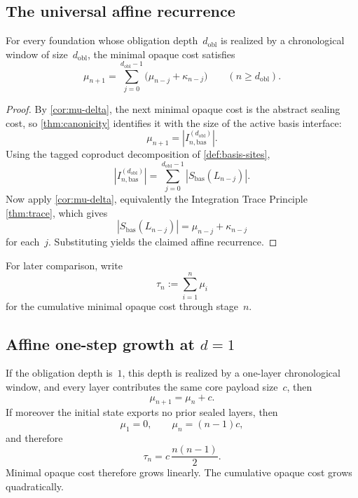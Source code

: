 \documentclass{lmcs}
\begin{document}
\subsection{The universal affine recurrence}

\begin{thm}
\label{thm:recurrence}
For every foundation whose obligation depth~$d_{\mathrm{obl}}$ is realized by a chronological window of size~$d_{\mathrm{obl}}$, the minimal opaque cost satisfies
\[
  \mu_{n+1} = \sum_{j=0}^{d_{\mathrm{obl}}-1} \bigl(\mu_{n-j} + \kappa_{n-j}\bigr)
  \qquad
  (n \geq d_{\mathrm{obl}}).
\]
\end{thm}

\begin{proof}
By \autoref{cor:mu-delta}, the next minimal opaque cost is the abstract sealing cost, so \autoref{thm:canonicity} identifies it with the size of the active basis interface:
\[
  \mu_{n+1} = |I_{n,\mathrm{bas}}^{(d_{\mathrm{obl}})}|.
\]
Using the tagged coproduct decomposition of \autoref{def:basis-sites},
\[
  |I_{n,\mathrm{bas}}^{(d_{\mathrm{obl}})}|
  =
  \sum_{j=0}^{d_{\mathrm{obl}}-1} |S_{\mathrm{bas}}(L_{n-j})|.
\]
Now apply \autoref{cor:mu-delta}, equivalently the Integration Trace Principle \autoref{thm:trace}, which gives
\[
  |S_{\mathrm{bas}}(L_{n-j})| = \mu_{n-j} + \kappa_{n-j}
\]
for each~$j$. Substituting yields the claimed affine recurrence.
\end{proof}

For later comparison, write
\[
  \tau_n := \sum_{i=1}^n \mu_i
\]
for the cumulative minimal opaque cost through stage~$n$.

\subsection{\texorpdfstring{Affine one-step growth at $d=1$}{Affine one-step growth at d=1}}

\begin{cor}
\label{cor:d1}
If the obligation depth is~$1$, this depth is realized by a one-layer chronological window, and every layer contributes the same core payload size~$c$, then
\[
  \mu_{n+1} = \mu_n + c.
\]
If moreover the initial state exports no prior sealed layers, then
\[
  \mu_1 = 0,
  \qquad
  \mu_n = (n-1)c,
\]
and therefore
\[
  \tau_n = c\,\frac{n(n-1)}{2}.
\]
Minimal opaque cost therefore grows linearly. The cumulative opaque cost grows quadratically.
\end{cor}
\end{document}
